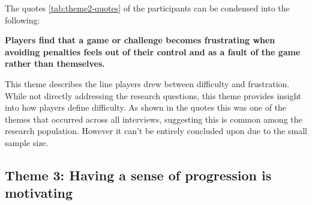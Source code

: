 The quotes \ref{tab:theme2-quotes} of the participants can be condensed into the following:
\begin{center}
    \textbf{Players find that a game or challenge becomes frustrating when avoiding penalties feels out of their control and as a fault of the game rather than themselves.}
\end{center}

This theme describes the line players drew between difficulty and frustration. While not directly addressing the research questions, this theme provides insight into how players define difficulty. As shown in the quotes this was one of the themes that occurred across all interviews, suggesting this is common among the research population. However it can't be entirely concluded upon due to the small sample size. 

\subsection{Theme 3: Having a sense of progression is motivating}\label{Theme 3}

